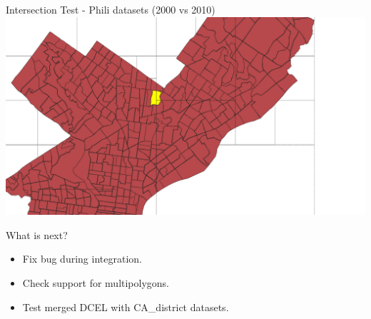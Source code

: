 \documentclass{beamer}
\begin{document}
\begin{frame}{Intersection Test - Phili datasets (2000 vs 2010)}
    \centering 
    \includegraphics[width=0.9\linewidth]{figures/Phili_test} 
\end{frame}

\begin{frame}{What is next?}
    \begin{itemize}
        \item Fix bug during integration.
        \item Check support for multipolygons.
        \item Test merged DCEL with CA\_district datasets.
    \end{itemize}
\end{frame}
\end{document}
